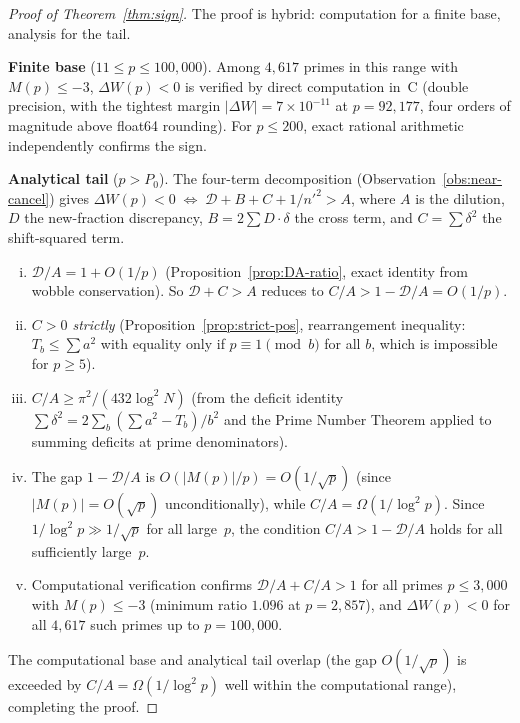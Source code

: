 \documentclass[11pt]{article}
\theoremstyle{definition}
\begin{document}
\begin{proof}[Proof of Theorem~\ref{thm:sign}]
The proof is hybrid: computation for a finite base, analysis
for the tail.

\textbf{Finite base} ($11 \le p \le 100{,}000$).
Among $4{,}617$ primes in this range with $M(p) \le -3$,
$\Delta W(p) < 0$ is verified by direct computation in~C
(double precision, with the tightest margin $|\Delta W| =
7 \times 10^{-11}$ at $p = 92{,}177$, four orders of magnitude
above float64 rounding).  For $p \le 200$, exact rational
arithmetic independently confirms the sign.

\textbf{Analytical tail} ($p > P_0$).
The four-term decomposition
(Observation~\ref{obs:near-cancel}) gives
$\Delta W(p) < 0 \;\Leftrightarrow\;
\mathcal{D} + B + C + 1/{n'}^2 > A$,
where $A$ is the dilution, $D$ the new-fraction discrepancy,
$B = 2\sum D \cdot \delta$ the cross term, and
$C = \sum \delta^2$ the shift-squared term.

\begin{enumerate}[(i)]
\item \emph{$\mathcal{D}/A = 1 + O(1/p)$}
(Proposition~\ref{prop:DA-ratio}, exact identity from
wobble conservation).  So $\mathcal{D} + C > A$ reduces to $C/A > 1 - \mathcal{D}/A = O(1/p)$.

\item \emph{$C > 0$ strictly}
(Proposition~\ref{prop:strict-pos}, rearrangement inequality:
$T_b \le \sum a^2$ with equality only if $p \equiv 1 \pmod{b}$
for all $b$, which is impossible for $p \ge 5$).

\item \emph{$C/A \ge \pi^2/(432 \log^2 N)$}
(from the deficit identity
$\sum \delta^2 = 2\sum_b (\sum a^2 - T_b)/b^2$
and the Prime Number Theorem applied to summing
deficits at prime denominators).

\item The gap $1 - \mathcal{D}/A$ is $O(|M(p)|/p) = O(1/\sqrt{p})$
(since $|M(p)| = O(\sqrt{p})$ unconditionally), while
$C/A = \Omega(1/\log^2 p)$.  Since $1/\log^2 p \gg 1/\sqrt{p}$
for all large~$p$, the condition $C/A > 1 - \mathcal{D}/A$ holds
for all sufficiently large~$p$.

\item Computational verification confirms
$\mathcal{D}/A + C/A > 1$ for all primes $p \le 3{,}000$
with $M(p) \le -3$ (minimum ratio $1.096$ at $p = 2{,}857$),
and $\Delta W(p) < 0$ for all $4{,}617$ such primes up to
$p = 100{,}000$.
\end{enumerate}

The computational base and analytical tail overlap (the
gap $O(1/\sqrt{p})$ is exceeded by $C/A = \Omega(1/\log^2 p)$
well within the computational range), completing the proof.
\end{proof}
\end{document}
